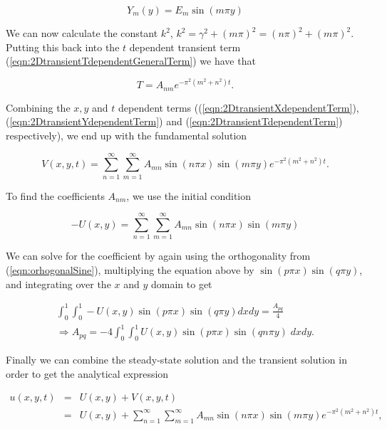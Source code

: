 \documentclass{article}
\begin{document}
\begin{equation}
Y_m(y) = E_m\sin(m\pi y)
\label{eqn:2DtransientYdependentTerm}
\end{equation}

We can now calculate the constant $k^2$,  $k^2 = \gamma^2 + (m\pi)^2 = (n\pi)^2 + (m\pi)^2$. Putting this back into the $t$ dependent transient term (\ref{eqn:2DtransientTdependentGeneralTerm}) we have that 

\begin{equation}
T = A_{nm}e^{-\pi^2(m^2+n^2)t}.
\label{eqn:2DtransientTdependentTerm}
\end{equation}

Combining the $x,y$ and $t$ dependent terms ((\ref{eqn:2DtransientXdependentTerm}), (\ref{eqn:2DtransientYdependentTerm}) and (\ref{eqn:2DtransientTdependentTerm}) respectively), we end up with the fundamental solution

\begin{equation}
V(x,y,t) = \sum_{n=1}^{\infty} \sum_{m=1}^{\infty} A_{mn}\sin(n\pi x)\sin(m\pi y)e^{-\pi^2(m^2+n^2)t}.
\end{equation}

To find the coefficients $A_{nm}$, we use the initial condition

\begin{equation}
-U(x,y) =  \sum_{n=1}^{\infty} \sum_{m=1}^{\infty} A_{mn}\sin(n\pi x)\sin(m\pi y)
\end{equation}

We can solve for the coefficient by again using the orthogonality from (\ref{eqn:orhogonalSine}), multiplying the equation above by $ \sin(p\pi x) \sin(q\pi y)$, and integrating over the $x$ and $y$ domain to get

\begin{subequations}
	\begin{eqnarray}
	\int_0^1 \int_0^1 -U(x,y) \sin(p\pi x)\sin(q\pi y) dxdy =  \frac{A_{pq}}{4}\\
	\Rightarrow A_{pq} = -4 \int_0^1 \int_0^1 U(x,y) \sin(p\pi x)\sin(qn\pi y)\; dxdy.
	\end{eqnarray}
\end{subequations}

Finally we can combine the steady-state solution and the transient solution in order to get the analytical expression

\begin{eqnarray}
u(x,y,t) &=& U(x,y) + V(x,y,t)\\ \nonumber
&=& U(x,y) + \sum_{n=1}^{\infty} \sum_{m=1}^{\infty} A_{mn}\sin(n\pi x)\sin(m\pi y)e^{-\pi^2(m^2+n^2)t},
\end{eqnarray}
\end{document}
